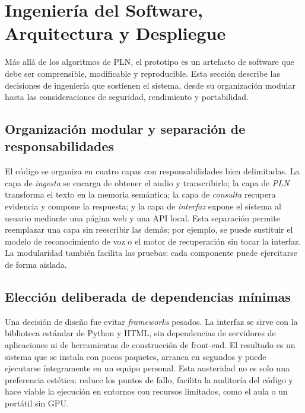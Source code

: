 \documentclass[12pt,a4paper]{article}
\begin{document}

\section{Ingeniería del Software, Arquitectura y Despliegue}
\label{sec:ingenieria}

Más allá de los algoritmos de PLN, el prototipo es un artefacto de software que debe ser comprensible, modificable y reproducible. Esta sección describe las decisiones de ingeniería que sostienen el sistema, desde su organización modular hasta las consideraciones de seguridad, rendimiento y portabilidad.

\subsection{Organización modular y separación de responsabilidades}

El código se organiza en cuatro capas con responsabilidades bien delimitadas. La capa de \emph{ingesta} se encarga de obtener el audio y transcribirlo; la capa de \emph{PLN} transforma el texto en la memoria semántica; la capa de \emph{consulta} recupera evidencia y compone la respuesta; y la capa de \emph{interfaz} expone el sistema al usuario mediante una página web y una API local. Esta separación permite reemplazar una capa sin reescribir las demás; por ejemplo, se puede sustituir el modelo de reconocimiento de voz o el motor de recuperación sin tocar la interfaz. La modularidad también facilita las pruebas: cada componente puede ejercitarse de forma aislada.

\subsection{Elección deliberada de dependencias mínimas}

Una decisión de diseño fue evitar \emph{frameworks} pesados. La interfaz se sirve con la biblioteca estándar de Python y HTML, sin dependencias de servidores de aplicaciones ni de herramientas de construcción de front-end. El resultado es un sistema que se instala con pocos paquetes, arranca en segundos y puede ejecutarse íntegramente en un equipo personal. Esta austeridad no es solo una preferencia estética: reduce los puntos de fallo, facilita la auditoría del código y hace viable la ejecución en entornos con recursos limitados, como el aula o un portátil sin GPU.
\end{document}
